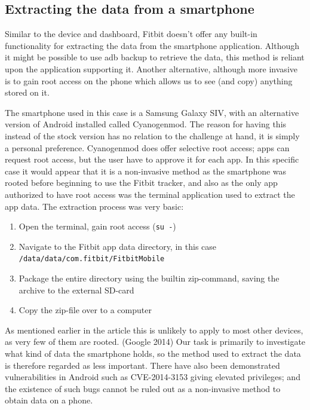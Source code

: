 \documentclass[a4paper,11pt,dvips]{article}
\begin{document}
\subsection{Extracting the data from a smartphone}

Similar to the device and dashboard, Fitbit doesn't offer any built-in functionality for extracting the data from the smartphone application. Although it might be possible to use adb backup to retrieve the data, this method is reliant upon the application supporting it. Another alternative, although more invasive is to gain root access on the phone which allows us to see (and copy) anything stored on it.

The smartphone used in this case is a Samsung Galaxy SIV, with an alternative version of Android installed called Cyanogenmod. The reason for having this instead of the stock version has no relation to the challenge at hand, it is simply a personal preference. Cyanogenmod does offer selective root access; apps can request root access, but the user have to approve it for each app. In this specific case it would appear that it is a non-invasive method as the smartphone was rooted before beginning to use the Fitbit tracker, and also as the only app authorized to have root access was the terminal application used to extract the app data. The extraction process was very basic:

\begin{enumerate}
\item Open the terminal, gain root access (\texttt{su -})
\item Navigate to the Fitbit app data directory, in this case \\ \texttt{/data/data/com.fitbit/FitbitMobile}
\item Package the entire directory using the builtin zip-command, saving the archive to the external SD-card
\item Copy the zip-file over to a computer
\end{enumerate}

As mentioned earlier in the article this is unlikely to apply to most other devices, as very few of them are rooted. (Google 2014) Our task is primarily to investigate what kind of data the smartphone holds, so the method used to extract the data is therefore regarded as less important. There have also been demonstrated vulnerabilities in Android such as CVE-2014-3153 giving elevated privileges; and the existence of such bugs cannot be ruled out as a non-invasive method to obtain data on a phone.
\end{document}
